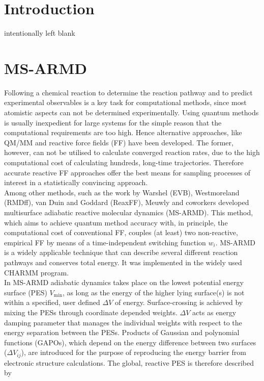 \documentclass[journal=jacsat,manuscript=article]{achemso}
\author{Markus Meuwly}
\affiliation{Department of Chemistry, University of Basel, Klingelbergstrasse 80, CH-4056 Basel, Switzerland.}
\date{\today}
\title{}
\begin{document}
\begin{abstract}

\end{abstract}

\clearpage

\section{Introduction}
\label{sec:introduction} 
intentionally left blank

\section{MS-ARMD}
\label{sec:msarmd}
Following a chemical reaction to determine the reaction pathway and to predict experimental observables is a key task for computational methods, since most atomistic aspects can not be determined experimentally.\cite{brooks.chemrev.1988.msarmd} Using quantum methods is usually inexpedient for large systems for the simple reason that the computational requirements are too high. Hence alternative approaches, like QM/MM\cite{warshel.jmb.1976.msarmd} and reactive force fields (FF) have been developed. The former, however, can not be utilised to calculate converged reaction rates, due to the high computational cost of calculating hundreds, long-time trajectories. Therefore accurate reactive FF approaches offer the best means for sampling processes of interest in a statistically convincing approach.\\
\noindent Among other methods, such as the work by Warshel (EVB)\cite{warshel.jacs.1980.msarmd}, Westmoreland (RMDff)\cite{westmoreland.molsimul.2007.msarmd}, van Duin and Goddard (ReaxFF)\cite{vanduin.jpca.2001.msarmd}, Meuwly and coworkers developed multisurface adiabatic reactive molecular dynamics (MS-ARMD)\cite{nagy.jctc.2014.msarmd}. This method, which aims to achieve quantum method accuracy with, in principle, the computational cost of conventional FF, couples (at least) two non-reactive, empirical FF by means of a time-independent switching function $w_i$. MS-ARMD is a widely applicable technique that can describe several different reaction pathways and conserves total energy. It was implemented in the widely used CHARMM program\cite{brooks.jcc.2009.msarmd}.\\

\noindent
In MS-ARMD adiabatic dynamics takes place on the lowest potential energy surface (PES) $V_{\text{min}}$, as long as the energy of the higher lying surface(s) is not within a specified, user defined $\Delta V$ of energy. Surface-crossing is achieved by mixing the PESs through coordinate depended weights. $\Delta V$ acts as energy damping parameter that manages the individual weights with respect to the energy separation between the PESs. Products of Gaussian and polynomial functions (GAPOs), which depend on the energy difference between two surfaces ($\Delta V_{ij}$), are introduced for the purpose of reproducing the energy barrier from electronic structure calculations. The global, reactive PES is therefore described by
\end{document}
